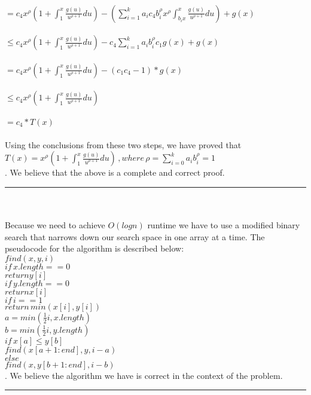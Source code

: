 \documentclass[tikz]{article}
\newcommand{\shortbar}{\begin{center}\rule{5ex}{0.1pt}\end{center}}
\theoremstyle{plain}
\theoremstyle{definition}
\theoremstyle{remark}
\newenvironment{solution}[1]{\medskip\noindent{\bf Problem #1.~}}{\shortbar}
\begin{document}
\begin{solution}{2}
\\
$=c_4 x^{\rho}(1 + \int_{1}^{x} \frac{g(u)}{u^{\rho + 1}}du) - (\sum_{i=1}^{k} a_i c_4 b_i^{\rho} x^{\rho} \int_{b_ix}^{x} \frac{g(u)}{u^{\rho + 1}}du) + g(x)$\\
\\
$\leq c_4 x^{\rho}(1 + \int_{1}^{x} \frac{g(u)}{u^{\rho + 1}}du) - c_4\sum_{i=1}^{k} a_i b_i^{\rho} c_1 g(x) + g(x)$\\
\\
$=c_4 x^{\rho}(1 + \int_{1}^{x} \frac{g(u)}{u^{\rho + 1}}du) - (c_1 c_4 - 1) * g(x)$\\
\\
$\leq c_4 x^{\rho}(1 + \int_{1}^{x} \frac{g(u)}{u^{\rho + 1}}du)$\\
\\
$=c_4*T(x)$\\
\\
Using the conclusions from these two steps, we have proved that\\
$T(x) = x^{\rho}(1 + \int_{1}^{x} \frac{g(u)}{u^{\rho + 1}}du) \, ,where \, \rho = \sum_{i=0}^{k} a_ib_i^{\rho} = 1$\\


\medskip
{}. We believe that the above is a complete and correct proof.

\end{solution}

\begin{solution}{3}\\\\
Because we need to achieve $O(logn)$ runtime we have to use a modified binary search that narrows down
our search space in one array at a time. The pseudocode for the algorithm is described below:\\

\noindent$find(x, y, i)$\\
\indent  $if\,x.length == 0$\\
\indent\indent    $return y[i]$\\
\indent  $if\,y.length == 0$\\
\indent\indent    $return x[i]$\\
\indent  $if\,i == 1$\\
\indent\indent   $return\,min(x[i], y[i])$\\
\indent  $a = min(\frac{1}{2}i, x.length)$\\
\indent $b = min(\frac{1}{2}i, y.length)$\\
\indent$if\,x[a] \leq y[b]$\\
\indent\indent  $find(x[a+1:end],y,i-a)$\\
\indent$else$\\
\indent\indent  $find(x,y[b+1:end],i-b)$\\

\medskip
{}. We believe the algorithm we have is correct in the context of the problem.
\end{solution}
\end{document}
